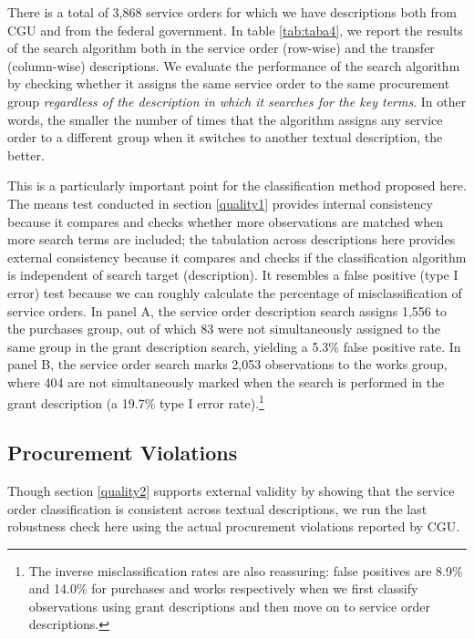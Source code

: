 \documentclass[]{article}
\let\rmarkdownfootnote\footnote%
\def\footnote{\protect\rmarkdownfootnote}
\theoremstyle{definition}
\theoremstyle{definition}
\theoremstyle{definition}
\theoremstyle{remark}
\begin{document}
There is a total of 3,868 service orders for which we have descriptions
both from CGU and from the federal government. In table \ref{tab:taba4},
we report the results of the search algorithm both in the service order
(row-wise) and the transfer (column-wise) descriptions. We evaluate the
performance of the search algorithm by checking whether it assigns the
same service order to the same procurement group \emph{regardless of the
description in which it searches for the key terms}. In other words, the
smaller the number of times that the algorithm assigns any service order
to a different group when it switches to another textual description,
the better.

This is a particularly important point for the classification method
proposed here. The means test conducted in section \ref{quality1}
provides internal consistency because it compares and checks whether
more observations are matched when more search terms are included; the
tabulation across descriptions here provides external consistency
because it compares and checks if the classification algorithm is
independent of search target (description). It resembles a false
positive (type I error) test because we can roughly calculate the
percentage of misclassification of service orders. In panel A, the
service order description search assigns 1,556 to the purchases group,
out of which 83 were not simultaneously assigned to the same group in
the grant description search, yielding a 5.3\% false positive rate. In
panel B, the service order search marks 2,053 observations to the works
group, where 404 are not simultaneously marked when the search is
performed in the grant description (a 19.7\% type I error
rate).\footnote{The inverse misclassification rates are also reassuring:
  false positives are 8.9\% and 14.0\% for purchases and works
  respectively when we first classify observations using grant
  descriptions and then move on to service order descriptions.}

\hypertarget{quality3}{%
\subsection{Procurement Violations}\label{quality3}}

Though section \ref{quality2} supports external validity by showing that
the service order classification is consistent across textual
descriptions, we run the last robustness check here using the actual
procurement violations reported by CGU.
\end{document}
